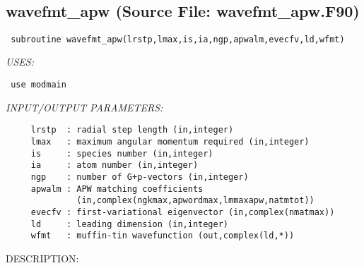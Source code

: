 \documentclass[11pt]{article}
\begin{document}

















 
 
\mbox{}\hrulefill\ 
 
\subsection{wavefmt\_apw (Source File: wavefmt\_apw.F90)}


\begin{verbatim} subroutine wavefmt_apw(lrstp,lmax,is,ia,ngp,apwalm,evecfv,ld,wfmt)\end{verbatim}{\em USES:}
\begin{verbatim} use modmain\end{verbatim}{\em INPUT/OUTPUT PARAMETERS:}
\begin{verbatim}     lrstp  : radial step length (in,integer)
     lmax   : maximum angular momentum required (in,integer)
     is     : species number (in,integer)
     ia     : atom number (in,integer)
     ngp    : number of G+p-vectors (in,integer)
     apwalm : APW matching coefficients
              (in,complex(ngkmax,apwordmax,lmmaxapw,natmtot))
     evecfv : first-variational eigenvector (in,complex(nmatmax))
     ld     : leading dimension (in,integer)
     wfmt   : muffin-tin wavefunction (out,complex(ld,*))\end{verbatim}
{\sf DESCRIPTION:\\ }
\end{document}
